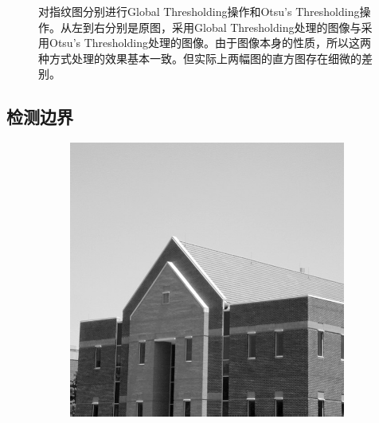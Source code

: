 \documentclass{article}
\begin{document}
\begin{figure}[htbp]
\begin{subfigure}{.32\textwidth}
    \end{subfigure}
    \caption{对指纹图分别进行Global Thresholding操作和Otsu's Thresholding操作。从左到右分别是原图，采用Global Thresholding处理的图像与采用Otsu's Thresholding处理的图像。由于图像本身的性质，所以这两种方式处理的效果基本一致。但实际上两幅图的直方图存在细微的差别。}
\end{figure}

\subsection{检测边界}

\begin{figure}[htbp]
    \centering
    \begin{subfigure}{.4\textwidth}
        \includegraphics[width=\linewidth]{img/Fig1006(a)(building).jpg}
    \end{subfigure}
    \begin{subfigure}{.4\textwidth}

\end{subfigure}
\end{figure}
\end{document}
